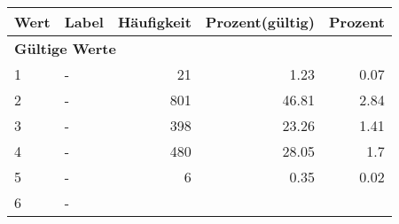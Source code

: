      \begin{longtable}{lXrrr}
     \toprule
     \textbf{Wert} & \textbf{Label} & \textbf{Häufigkeit} & \textbf{Prozent(gültig)} & \textbf{Prozent} \\
     \endhead
     \midrule
     \multicolumn{5}{l}{\textbf{Gültige Werte}}\\

     1 &
     \multicolumn{1}{X}{ -  } &


       \num{21} &
       \num[round-mode=places,round-precision=2]{1,23} &
         \num[round-mode=places,round-precision=2]{0,07} \\

     2 &
     \multicolumn{1}{X}{ -  } &


       \num{801} &
       \num[round-mode=places,round-precision=2]{46,81} &
         \num[round-mode=places,round-precision=2]{2,84} \\

     3 &
     \multicolumn{1}{X}{ -  } &


       \num{398} &
       \num[round-mode=places,round-precision=2]{23,26} &
         \num[round-mode=places,round-precision=2]{1,41} \\

     4 &
     \multicolumn{1}{X}{ -  } &


       \num{480} &
       \num[round-mode=places,round-precision=2]{28,05} &
         \num[round-mode=places,round-precision=2]{1,7} \\

     5 &
     \multicolumn{1}{X}{ -  } &


       \num{6} &
       \num[round-mode=places,round-precision=2]{0,35} &
         \num[round-mode=places,round-precision=2]{0,02} \\

     6 &
     \multicolumn{1}{X}{ -  } &



\end{longtable}
